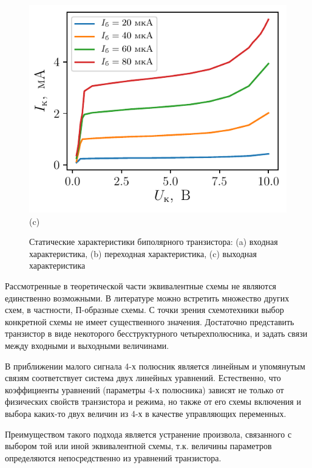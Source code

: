 \begin{figure}[H]
    \label{fig:1}
    \centering
   \begin{minipage}{0.49\linewidth}
        \centering
        \includegraphics[scale=1]{fig/3.pdf}
        \newline
        (c)
    \end{minipage}
    \caption{Статические характеристики биполярного транзистора:
    (a) входная характеристика, (b) переходная характеристика, (c) выходная характеристика}
\end{figure}


Рассмотренные в теоретической части эквивалентные схемы не являются единственно возможными. В литературе можно встретить множество других схем, в частности, П-образные схемы.
С точки зрения схемотехники выбор конкретной схемы не имеет существенного значения. Достаточно представить транзистор в виде некоторого бесструктурного 
четырехполюсника, и задать связи между входными и выходными величинами.

В приближении малого сигнала 4-х полюсник является линейным и упомянутым связям соответствует система двух линейных уравнений.
Естественно, что коэффициенты уравнений (параметры 4-х полюсника) зависят не только от физических свойств транзистора и режима,
но также от его схемы включения и выбора каких-то двух величин из 4-х в качестве управляющих переменных.

Преимуществом такого подхода является устранение произвола, связанного с выбором той или иной эквивалентной схемы, т.к. величины
параметров определяются непосредственно из уравнений транзистора.

